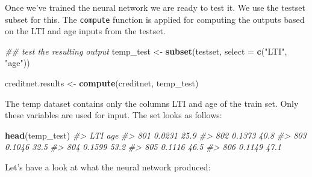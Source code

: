 \documentclass[]{book}
\newenvironment{Shaded}{\begin{snugshade}}{\end{snugshade}}
\newcommand{\CommentTok}[1]{\textcolor[rgb]{0.56,0.35,0.01}{\textit{#1}}}
\newcommand{\DataTypeTok}[1]{\textcolor[rgb]{0.13,0.29,0.53}{#1}}
\newcommand{\DecValTok}[1]{\textcolor[rgb]{0.00,0.00,0.81}{#1}}
\newcommand{\KeywordTok}[1]{\textcolor[rgb]{0.13,0.29,0.53}{\textbf{#1}}}
\newcommand{\NormalTok}[1]{#1}
\newcommand{\OperatorTok}[1]{\textcolor[rgb]{0.81,0.36,0.00}{\textbf{#1}}}
\newcommand{\StringTok}[1]{\textcolor[rgb]{0.31,0.60,0.02}{#1}}
\begin{document}
Once we've trained the neural network we are ready to test it. We use the testset subset for this. The \texttt{compute} function is applied for computing the outputs based on the LTI and age inputs from the testset.

\begin{Shaded}
\begin{Highlighting}[]
\CommentTok{## test the resulting output}
\NormalTok{temp_test <-}\StringTok{ }\KeywordTok{subset}\NormalTok{(testset, }\DataTypeTok{select =} \KeywordTok{c}\NormalTok{(}\StringTok{"LTI"}\NormalTok{, }\StringTok{"age"}\NormalTok{))}

\NormalTok{creditnet.results <-}\StringTok{ }\KeywordTok{compute}\NormalTok{(creditnet, temp_test)}
\end{Highlighting}
\end{Shaded}

The temp dataset contains only the columns LTI and age of the train set. Only these variables are used for input. The set looks as follows:

\begin{Shaded}
\begin{Highlighting}[]
\KeywordTok{head}\NormalTok{(temp_test)}
\CommentTok{#>        LTI  age}
\CommentTok{#> 801 0.0231 25.9}
\CommentTok{#> 802 0.1373 40.8}
\CommentTok{#> 803 0.1046 32.5}
\CommentTok{#> 804 0.1599 53.2}
\CommentTok{#> 805 0.1116 46.5}
\CommentTok{#> 806 0.1149 47.1}
\end{Highlighting}
\end{Shaded}

Let's have a look at what the neural network produced:

\begin{Shaded}
\end{Shaded}
\end{document}

